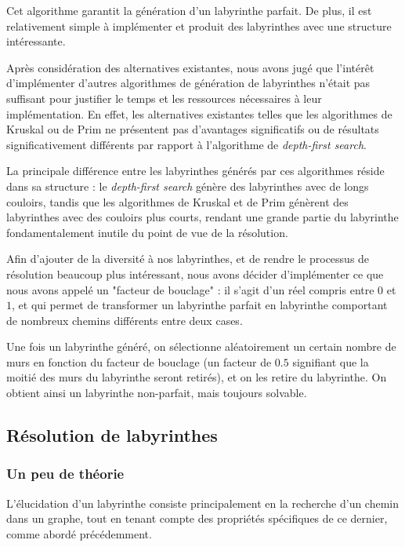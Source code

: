 \documentclass[12pt]{scrreprt} %
\begin{document}
Cet algorithme garantit la génération d'un labyrinthe parfait. De plus, il est relativement simple à implémenter et produit des labyrinthes avec une structure intéressante.

Après considération des alternatives existantes, nous avons jugé que l'intérêt d'implémenter d'autres algorithmes de génération de labyrinthes n'était pas suffisant pour justifier le temps et les ressources nécessaires à leur implémentation. En effet, les alternatives existantes telles que les algorithmes de Kruskal ou de Prim ne présentent pas d'avantages significatifs ou de résultats significativement différents par rapport à l'algorithme de \textit{depth-first search}.

La principale différence entre les labyrinthes générés par ces algorithmes réside dans sa structure : le \textit{depth-first search} génère des labyrinthes avec de longs couloirs, tandis que les algorithmes de Kruskal et de Prim génèrent des labyrinthes avec des couloirs plus courts, rendant une grande partie du labyrinthe fondamentalement inutile du point de vue de la résolution.

Afin d'ajouter de la diversité à nos labyrinthes, et de rendre le processus de résolution beaucoup plus intéressant, nous avons décider d'implémenter ce que nous avons appelé un "facteur de bouclage" : il s'agit d'un réel compris entre $0$ et $1$, et qui permet de transformer un labyrinthe parfait en labyrinthe comportant de nombreux chemins différents entre deux cases.

Une fois un labyrinthe généré, on sélectionne aléatoirement un certain nombre de murs en fonction du facteur de bouclage (un facteur de $0.5$ signifiant que la moitié des murs du labyrinthe seront retirés), et on les retire du labyrinthe. On obtient ainsi un labyrinthe non-parfait, mais toujours solvable.

\subsection{Résolution de labyrinthes}

\subsubsection{Un peu de théorie}

L'élucidation d'un labyrinthe consiste principalement en la recherche d'un chemin dans un graphe, tout en tenant compte des propriétés spécifiques de ce dernier, comme abordé précédemment.
\end{document}
